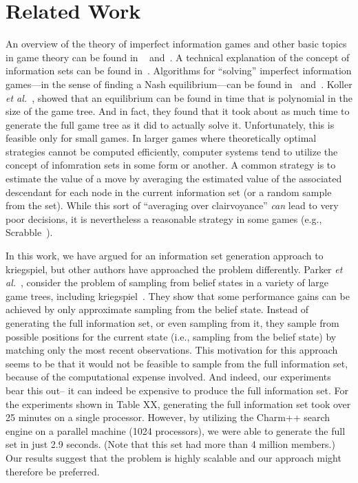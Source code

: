 \documentclass[11pt]{article}
\newcommand{\etal}{{\em et al.}\ }
\begin{document}
\section{Related Work}
An overview of the theory of imperfect information games and other basic topics in game theory can be found in
~\cite{kuhn03lectures} and~\cite{kuhn97classics}.  A technical explanation of the concept of information sets can be
found in~\cite{gilpin07algorithms}.  Algorithms for ``solving'' imperfect information games---in the sense of finding a
Nash equilibrium---can be found in~\cite{koller94fast} and~\cite{koller97representations}.  Koller \etal, showed that an
equilibrium can be found in time that is polynomial in the size of the game tree.  And in fact, they found that it took
about as much time to generate the full game tree as it did to actually solve it.  Unfortunately, this is feasible only
for small games.  In larger games where theoretically optimal strategies cannot be computed efficiently, computer
systems tend to utilize the concept of infomration sets in some form or another.  A common strategy is to estimate the
value of a move by averaging the estimated value of the associated descendant for each node in the current information
set (or a random sample from the set).  While this sort of ``averaging over clairvoyance'' {\em can} lead to very poor
decisions, it is nevertheless a reasonable strategy in some games (e.g., Scrabble~\cite{sheppard02world}).

In this work, we have argued for an information set generation approach to kriegspiel, but other authors have approached
the problem differently.  Parker \etal, consider the problem of sampling from belief states in a variety of large
game trees, including kriegspiel~\cite{parker05game}.  They show that some performance gains can be achieved by only
approximate sampling from the belief state.  Instead of generating the full information set, or even sampling from it,
they sample from possible positions for the current state (i.e., sampling from the belief state) by matching only the
most recent observations.  This motivation for this approach seems to be that it would not be feasible to sample from
the full information set, because of the computational expense involved.  And indeed, our experiments bear this out-- it
can indeed be expensive to produce the full information set.  For the experiments shown in Table XX, generating the full
information set took over 25 minutes on a single processor.  However, by utilizing the Charm++ search engine on a
parallel machine (1024 processors), we were able to generate the full set in just 2.9 seconds.  (Note that this set had
more than 4 million members.)  Our results suggest that the problem is highly scalable and our approach might therefore
be preferred.
\end{document}
